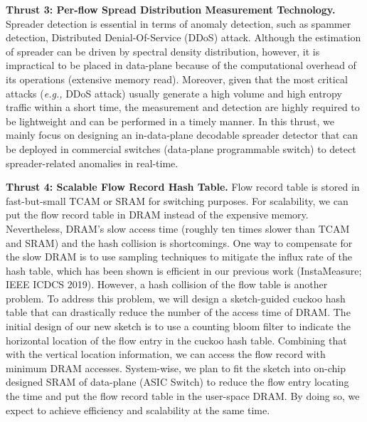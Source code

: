 \documentclass{NSF}
\newcommand{\BfPara}[1]{{\noindent\textbf{#1.}}\xspace}
\newcommand{\eg}{{\em e.g.,}\xspace}
\begin{document}
\BfPara{Thrust 3: Per-flow Spread Distribution Measurement Technology}
Spreader detection is essential in terms of anomaly detection, such as spammer detection, Distributed Denial-Of-Service (DDoS) attack. Although the estimation of spreader can be driven by spectral density distribution, however, it is impractical to be placed in data-plane because of the computational overhead of its operations (extensive memory read). Moreover, given that the most critical attacks (\eg DDoS attack) usually generate a high volume and high entropy traffic within a short time, the measurement and detection are highly required to be lightweight and can be performed in a timely manner. In this thrust, we mainly focus on designing an in-data-plane decodable spreader detector that can be deployed in commercial switches (data-plane programmable switch) to detect spreader-related anomalies in real-time. 

\BfPara{Thrust 4: Scalable Flow Record Hash Table} 
Flow record table is stored in fast-but-small TCAM or SRAM for switching purposes. 
For scalability, we can put the flow record table in DRAM instead of the expensive memory. 
Nevertheless, DRAM's slow access time
(roughly ten times slower than TCAM and SRAM) and the hash collision is shortcomings. One way to compensate for the slow DRAM is to use sampling techniques to mitigate the influx rate of the hash table, which has been shown is efficient in our previous work (InstaMeasure; IEEE ICDCS 2019). However, a hash collision of the flow table is another problem. 
To address this problem, we will design a sketch-guided cuckoo hash table that can drastically reduce the number of the access time of DRAM. The initial design of our new sketch is to use a counting bloom filter to indicate the horizontal location of the flow entry in the cuckoo hash table. Combining that with the vertical location information, we can access the flow record with minimum DRAM accesses. 
System-wise, we plan to fit the sketch into on-chip designed SRAM of data-plane (ASIC Switch) to reduce the flow entry locating the time and put the flow record table in the user-space DRAM. By doing so, we expect to achieve efficiency and scalability at the same time. 
\end{document}
